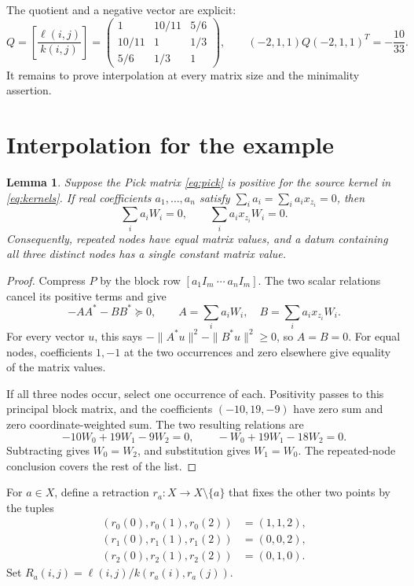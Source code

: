\documentclass[11pt]{article}
\newtheorem{lemma}[theorem]{Lemma}
\newcommand{\psd}{\succeq0}
\begin{document}
The quotient and a negative vector are explicit:
\begin{equation}\label{eq:negative}
 Q=\left[\frac{\ell(i,j)}{k(i,j)}\right]
 =\begin{pmatrix}1&10/11&5/6\\10/11&1&1/3\\5/6&1/3&1\end{pmatrix},
 \qquad
 (-2,1,1)Q(-2,1,1)^T=-\frac{10}{33}.
\end{equation}
It remains to prove interpolation at every matrix size and the
minimality assertion.

\section{Interpolation for the example}
\begin{lemma}\label{lem:relations}
Suppose the Pick matrix \eqref{eq:pick} is positive for the source kernel
in \eqref{eq:kernels}. If real coefficients $a_1,\ldots,a_n$ satisfy
$\sum_i a_i=\sum_i a_i x_{z_i}=0$, then
\[
 \sum_i a_iW_i=0,\qquad \sum_i a_i x_{z_i}W_i=0.
\]
Consequently, repeated nodes have equal matrix values, and a datum
containing all three distinct nodes has a single constant matrix value.
\end{lemma}
\begin{proof}
Compress $P$ by the block row $[a_1I_m\ \cdots\ a_nI_m]$.
The two scalar relations cancel its positive terms and give
\[
  -AA^*-BB^*\psd,\qquad
  A=\sum_i a_iW_i,\quad B=\sum_i a_ix_{z_i}W_i.
\]
For every vector $u$, this says
$-\|A^*u\|^2-\|B^*u\|^2\geq0$, so $A=B=0$.
For equal nodes, coefficients $1,-1$ at the two occurrences and zero
elsewhere give equality of the matrix values.

If all three nodes occur, select one occurrence of each. Positivity
passes to this principal block matrix, and the coefficients
$(-10,19,-9)$ have zero sum and zero coordinate-weighted sum.
The two resulting relations are
\[
 -10W_0+19W_1-9W_2=0,\qquad -W_0+19W_1-18W_2=0.
\]
Subtracting gives $W_0=W_2$, and substitution gives $W_1=W_0$.
The repeated-node conclusion covers the rest of the list.
\end{proof}

For $a\in X$, define a retraction $r_a:X\to X\setminus\{a\}$ that fixes
the other two points by the tuples
\[
\begin{aligned}
(r_0(0),r_0(1),r_0(2))&=(1,1,2),\\
(r_1(0),r_1(1),r_1(2))&=(0,0,2),\\
(r_2(0),r_2(1),r_2(2))&=(0,1,0).
\end{aligned}
\]
Set $R_a(i,j)=\ell(i,j)/k(r_a(i),r_a(j))$.
\end{document}
